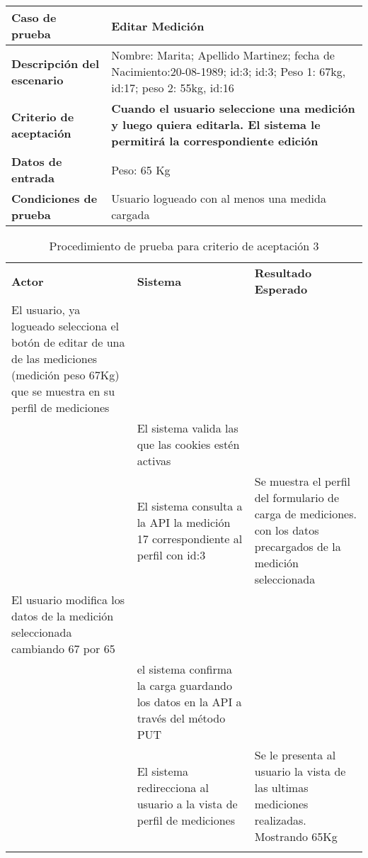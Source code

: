 
{\scriptsize
	\begin{table}[h]
	\centering
	\begin{tabular}{|m{3cm}|m{10cm}|}
    	\rowcolor[gray]{0.9}
	    \hline
	    \textbf{Caso de prueba} & \textbf{Editar Medición}\\  \hline
	    \textbf{Descripción del escenario}&  Nombre: Marita; Apellido Martinez; fecha de Nacimiento:20-08-1989; id:3; id:3; Peso 1: 67kg, id:17; peso 2: 55kg, id:16\\ \hline
	    \textbf{Criterio de aceptación}& \textbf{Cuando el usuario seleccione una medición  y luego quiera editarla. El sistema le permitirá la correspondiente edición}\\ \hline
        \textbf{Datos de entrada}& Peso: 65 Kg \\ \hline
        \textbf{Condiciones de  prueba}& Usuario logueado con al menos una medida cargada \\ \hline
	    \end{tabular}
	    \end{table}
	}
    

	\begin{longtable}{|p{5cm}|p{5cm}|p{4cm}|}
	    \hline \hline \rowcolor[gray]{0.9}
        \multicolumn{3}{|c|}{\textbf{Procedimiento de Prueba - Editar mediciones}} \\ \hline
	    \hline 
        \rowcolor[gray]{0.9}
	    \textbf{Actor} & \textbf{Sistema}& \textbf{Resultado Esperado} \\  \hline
	    El usuario, ya logueado selecciona el botón de editar de una de las mediciones (medición peso 67Kg) que se muestra en su perfil de mediciones& & \\ \hline
        & El sistema valida las que las cookies estén activas & \\ \hline
        & El sistema consulta a la API la medición 17 correspondiente al perfil con id:3 & Se muestra el perfil del formulario de carga de mediciones. con los datos precargados de la medición seleccionada\\ \hline        
	    El usuario modifica los datos de la medición seleccionada cambiando 67 por 65&  &\\ \hline
        & el sistema confirma la carga guardando los datos en la API a través del método PUT&\\ \hline
        &El sistema redirecciona al usuario a la vista de perfil de mediciones&  Se le presenta al usuario la vista de las ultimas mediciones realizadas. Mostrando 65Kg \\ \hline
        		\caption{Procedimiento de prueba para criterio de aceptación 3}
	    \end{longtable}
	
